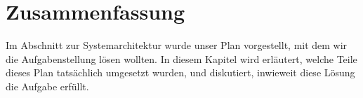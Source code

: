 \section{Zusammenfassung}

Im Abschnitt zur Systemarchitektur wurde unser Plan vorgestellt, mit dem wir die Aufgabenstellung
lösen wollten.
In diesem Kapitel wird erläutert, welche Teile dieses Plan tatsächlich umgesetzt wurden, und
diskutiert, inwieweit diese Lösung die Aufgabe erfüllt.




